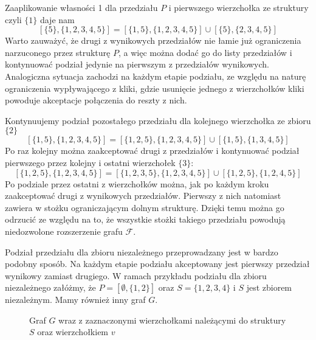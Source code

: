 \documentclass[11pt]{article}
\begin{document}
 Zaaplikowanie własności 1 dla przedziału $P$ i pierwszego wierzchołka ze struktury czyli $\{1\}$ daje nam 
$$[\{5\},\{1,2,3,4,5\}] = [\{1,5\},\{1,2,3,4,5\}] \cup [\{5\},\{2,3,4,5\}]$$ 
Warto zauważyć, że drugi z wynikowych przedziałów nie łamie już ograniczenia narzuconego przez strukturę $P$, a więc można dodać go do listy przedziałów i kontynuować podział jedynie na pierwszym z przedziałów wynikowych. Analogiczna sytuacja zachodzi na każdym etapie podziału, ze względu na naturę ograniczenia wypływającego z kliki, gdzie usunięcie jednego z wierzchołków kliki powoduje akceptacje połączenia do reszty z nich. 

Kontynuujemy podział pozostałego przedziału dla kolejnego wierzchołka ze zbioru $\{2\}$
$$[\{1,5\},\{1,2,3,4,5\}] = [\{1,2,5\},\{1,2,3,4,5\}] \cup [\{1,5\},\{1,3,4,5\}]$$ 
Po raz kolejny można zaakceptować drugi z przedziałów i kontynuować podział pierwszego przez kolejny i ostatni wierzchołek $\{3\}$: 
$$[\{1,2,5\},\{1,2,3,4,5\}] = [\{1,2,3,5\},\{1,2,3,4,5\}] \cup [\{1,2,5\},\{1,2,4,5\}]$$
Po podziale przez ostatni z wierzchołków można, jak po każdym kroku zaakceptować drugi z wynikowych przedziałów. Pierwszy z nich natomiast zawiera w stożku ograniczającym dolnym strukturę. Dzięki temu można go odrzucić ze względu na to, że wszystkie stożki takiego przedziału powodują niedozwolone rozszerzenie grafu $\mathcal{F}$.

Podział przedziału dla zbioru niezależnego przeprowadzany jest w bardzo podobny sposób. Na każdym etapie podziału akceptowany jest pierwszy przedział wynikowy zamiast drugiego. W ramach przykładu podziału dla zbioru niezależnego załóżmy, że 
$P = [\emptyset,\{1,2\}]$ oraz $S = \{1,2,3,4\}$ i $S$ jest zbiorem niezależnym. Mamy również inny graf $G$.
\begin{figure}[H]
  \centering
    \caption{Graf $G$ wraz z zaznaczonymi wierzchołkami należącymi do struktury $S$ oraz wierzchołkiem $v$}
 \end{figure}
 
\end{document}
